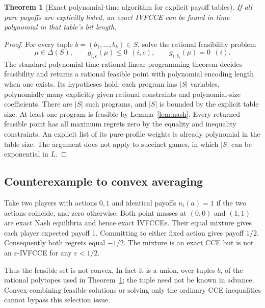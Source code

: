 \documentclass[11pt,a4paper]{article}
\newtheorem{theorem}{Theorem}[section]
\theoremstyle{definition}\newtheorem{definition}[theorem]{Definition}
\theoremstyle{remark}\newtheorem{remark}[theorem]{Remark}
\newcommand{\1}{\mathbf 1}
\begin{document}
\begin{theorem}[Exact polynomial-time algorithm for explicit payoff tables]\label{thm:explicit}
If all pure payoffs are explicitly listed, an exact IVFCCE can be found in time polynomial in that table's bit length.
\end{theorem}
\begin{proof}
For every tuple $b=(b_1,\ldots,b_k)\in S$, solve the rational feasibility problem
\[
 \mu\in\Delta(S),\qquad
 g_{i,c}(\mu)\le0\ \ (i,c),\qquad
 g_{i,b_i}(\mu)=0\ \ (i).
\]
The standard polynomial-time rational linear-programming theorem decides feasibility and returns a rational feasible point with polynomial encoding length when one exists. Its hypotheses hold: each program has $|S|$ variables, polynomially many explicitly given rational constraints and polynomial-size coefficients. There are $|S|$ such programs, and $|S|$ is bounded by the explicit table size. At least one program is feasible by Lemma~\ref{lem:nash}. Every returned feasible point has all maximum regrets zero by the equality and inequality constraints. An explicit list of its pure-profile weights is already polynomial in the table size. The argument does not apply to succinct games, in which $|S|$ can be exponential in $L$.
\end{proof}

\subsection{Counterexample to convex averaging}
Take two players with actions $0,1$ and identical payoffs $u_i(a)=1$ if the two actions coincide, and zero otherwise. Both point masses at $(0,0)$ and $(1,1)$ are exact Nash equilibria and hence exact IVFCCEs. Their equal mixture gives each player expected payoff 1. Committing to either fixed action gives payoff $1/2$. Consequently both regrets equal $-1/2$. The mixture is an exact CCE but is not an $\varepsilon$-IVFCCE for any $\varepsilon<1/2$.

Thus the feasible set is not convex. In fact it is a union, over tuples $b$, of the rational polytopes used in Theorem~\ref{thm:explicit}; the tuple need not be known in advance. Convex-combining feasible solutions or solving only the ordinary CCE inequalities cannot bypass this selection issue.
\end{document}
